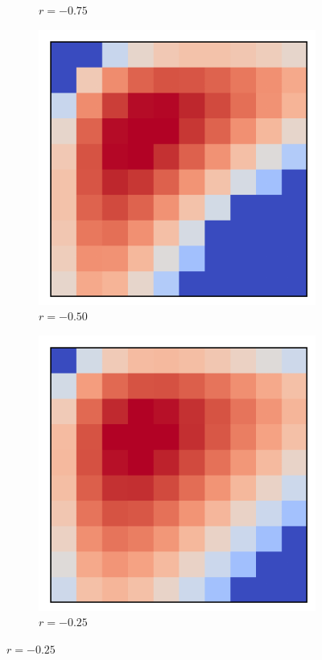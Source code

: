 \begin{figure}[bt]
\begin{subfigure}[b]{0.205\textwidth}
         \caption{$r=-0.75$}
         \label{fig:rexb}
     \end{subfigure}
     \hfill
     \begin{subfigure}[b]{0.205\textwidth}
         \centering
         \includegraphics[width=\textwidth]{./figures/general_networks/assort_mat_-50.pdf}
         \caption{$r=-0.50$}
         \label{fig:rexc}
     \end{subfigure}
     \hfill
     \begin{subfigure}[b]{0.205\textwidth}
         \centering
         \includegraphics[width=\textwidth]{./figures/general_networks/assort_mat_-25.pdf}
         \caption{$r=-0.25$}
         \label{fig:rexd}
     \end{subfigure}
     \hfill
     

\end{figure}
